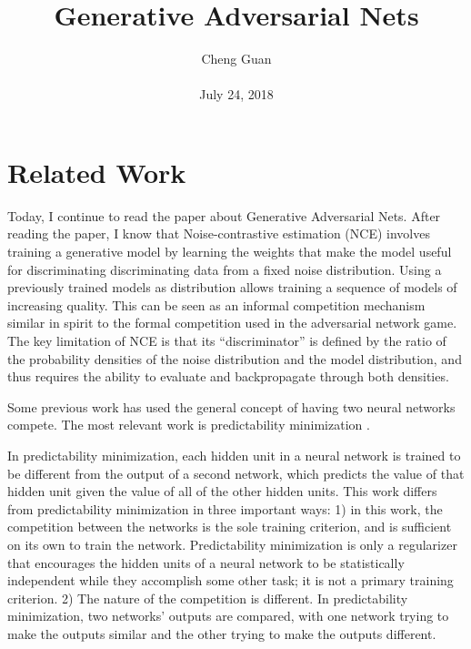 \documentclass[10pt,twocolumn,letterpaper]{article}
\title{Generative Adversarial Nets}
\author{Cheng Guan\\\\
July 24, 2018}
\begin{document}
\maketitle
\section{Related Work}
Today, I continue to read the paper about Generative Adversarial Nets. After reading the paper, I know that Noise-contrastive estimation (NCE) \cite{gutmann2010noise} involves training a generative model by learning the weights that make the model useful for discriminating discriminating data from a fixed noise distribution. Using a previously trained models as distribution allows training a sequence of models of increasing quality. This can be seen as an informal competition mechanism similar in spirit to the formal competition used in the adversarial network game. The key limitation of NCE is that its ``discriminator'' is defined by the ratio of the probability densities of the noise distribution and the model distribution, and thus requires the ability to evaluate and backpropagate through both densities.
\par
Some previous work has used the general concept of having two neural networks compete. The most
relevant work is predictability minimization \cite{schmidhuber1992learning}. 
\par
In predictability minimization, each hidden unit
in a neural network is trained to be different from the output of a second network, which predicts
the value of that hidden unit given the value of all of the other hidden units. This work differs from
predictability minimization in three important ways: 1) in this work, the competition between the
networks is the sole training criterion, and is sufficient on its own to train the network. Predictability
minimization is only a regularizer that encourages the hidden units of a neural network to be statistically independent while they accomplish some other task; it is not a primary training criterion. 2) The nature of the competition is different. In predictability minimization, two networks' outputs
are compared, with one network trying to make the outputs similar and the other trying to make the
outputs different.
\end{document}
